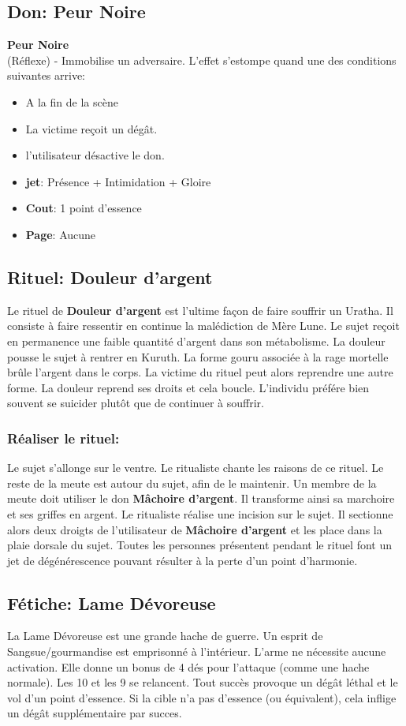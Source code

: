 \documentclass[oneside,12pt]{book}
\newcommand\don[6]{
\textbf{#1} \\
(#6) - #2
\begin{itemize}
\item{ \textbf{jet}: #3}
\item{ \textbf{Cout}: #4}
\item{ \textbf{Page}: #5}
\end{itemize}
\vspace{0.5cm}
}
\begin{document}
\begin{flushleft}
\subsection{Don: Peur Noire}
\label{Peur_mortelle}
\don{Peur Noire}{Immobilise un adversaire. L'effet s'estompe quand une des conditions suivantes arrive:
\begin{itemize}
\item A la fin de la scène
\item La victime reçoit un dégât. 
\item l'utilisateur désactive le don. 
\end{itemize}}{Présence + Intimidation + Gloire}{1 point d'essence}{Aucune}{Réflexe}


\subsection{Rituel: Douleur d'argent}
Le rituel de \textbf{Douleur d'argent} est l'ultime façon de faire souffrir un Uratha. 
Il consiste à faire ressentir en continue la malédiction de Mère Lune.
Le sujet reçoit en permanence une faible quantité d'argent dans son métabolisme. 
La douleur pousse le sujet à rentrer en Kuruth. La forme gouru associée à la rage mortelle brûle l'argent dans le corps.
La victime du rituel peut alors reprendre une autre forme. La douleur reprend ses droits et cela boucle. 
L'individu préfére bien souvent se suicider plutôt que de continuer à souffrir.

\subsubsection{Réaliser le rituel:}
Le sujet s'allonge sur le ventre. Le ritualiste chante les raisons de ce rituel. 
Le reste de la meute est autour du sujet, afin de le maintenir. 
Un membre de la meute doit utiliser le don \textbf{Mâchoire d'argent}. Il transforme ainsi sa marchoire et ses griffes en argent.
Le ritualiste réalise une incision sur le sujet. 
Il sectionne alors deux droigts de l'utilisateur de \textbf{Mâchoire d'argent} et les place dans la plaie dorsale du sujet.
Toutes les personnes présentent pendant le rituel font un jet de dégénérescence pouvant résulter à la perte
d'un point d'harmonie.

\subsection{Fétiche: Lame Dévoreuse}
\label{devoreuse}
La Lame Dévoreuse est une grande hache de guerre. 
Un esprit de Sangsue/gourmandise est emprisonné à l'intérieur. 
L'arme ne nécessite aucune activation. Elle donne un bonus de 4 dés pour l'attaque (comme une hache normale).
Les 10 et les 9 se relancent. 
Tout succès provoque un dégât léthal et le vol d'un point d'essence. Si la cible n'a pas d'essence (ou équivalent),
cela inflige un dégât supplémentaire par succes.  





\end{flushleft}
\end{document}
